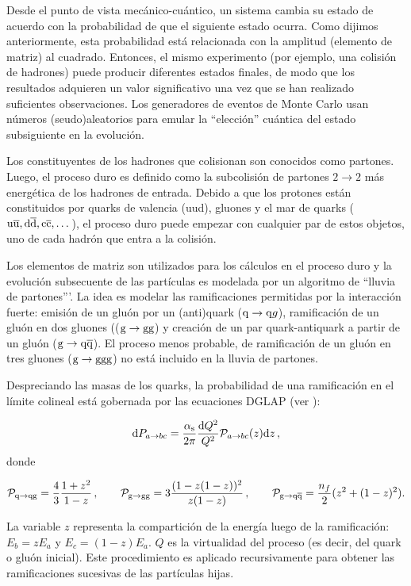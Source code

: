 Desde el punto de vista mecánico-cuántico, un sistema cambia su estado de acuerdo con la probabilidad de que el siguiente estado ocurra. Como dijimos anteriormente, esta probabilidad está relacionada con la amplitud (elemento de matriz) al cuadrado. Entonces, el mismo experimento (por ejemplo, una colisión de hadrones) puede producir diferentes estados finales, de modo que los resultados adquieren un valor significativo una vez que se han realizado suficientes observaciones. Los generadores de eventos de Monte Carlo usan números (seudo)aleatorios para emular la ``elección'' cuántica del estado subsiguiente en la evolución.

Los constituyentes de los hadrones que colisionan son conocidos como partones. Luego, el proceso duro es definido como la subcolisión de partones $2\to 2$ más energética de los hadrones de entrada. Debido a que los protones están constituidos por quarks de valencia (uud), gluones y el mar de quarks (${\mathrm u}\overline{\mathrm u}, {\mathrm d}\overline{\mathrm d}, {\mathrm c}\overline{\mathrm c},\dots$), el proceso duro puede empezar con cualquier par de estos objetos, uno de cada hadrón que entra a la colisión.

Los elementos de matriz son utilizados para los cálculos en el proceso duro y la evolución subsecuente de las partículas es modelada por un algoritmo de ``lluvia de partones'''. La idea es modelar las ramificaciones permitidas por la interacción fuerte: emisión de un gluón por un (anti)quark (${\mathrm q}\to{\mathrm q} g$), ramificación de un gluón en dos gluones ((${\mathrm g}\to{\mathrm g}{\mathrm g}$) y creación de un par quark-antiquark a partir de un gluón (${\mathrm g}\to{\mathrm q}\overline{\mathrm q}$). El proceso menos probable, de ramificación de un gluón en tres gluones (${\mathrm g}\to{\mathrm g}{\mathrm g}{\mathrm g}$) no está incluido en la lluvia de partones.

Despreciando las masas de los quarks, la probabilidad de una ramificación en el límite
colineal está gobernada por las ecuaciones DGLAP (ver \cite{Sjostrand:2009ad}):

\begin{equation}
  {\mathrm d} P_{a\to bc} = \frac{\alpha_{\mathrm{s}}}{2\pi}\frac{{\mathrm d} Q^2}{Q^2}\mathcal{P}_{a\rightarrow bc}(z) {\mathrm d} z\label{eq:DGLAP}
  \, ,
\end{equation}
donde

$$
\mathcal{P}_{{\mathrm q}\to {\mathrm q}{\mathrm g}} = \frac43 \frac{1+z^2}{1-z}
  \, , \hspace{2em}
\mathcal{P}_{{\mathrm g}\to {\mathrm g}{\mathrm g}} = 3 \frac{(1-z(1-z))^2}{z(1-z)}
  \, , \hspace{2em}
\mathcal{P}_{{\mathrm g}\to {\mathrm q}\overline{\mathrm q}} = \frac{n_f}2 (z^2+(1-z)^2).
$$

La variable $z$ representa la compartición de la energía luego de la ramificación: $E_b=zE_a$ y $E_c=(1-z)E_a$. $Q$ es la virtualidad del proceso (es decir, del quark o gluón inicial). Este procedimiento es aplicado recursivamente para obtener las ramificaciones sucesivas de las partículas hijas.


